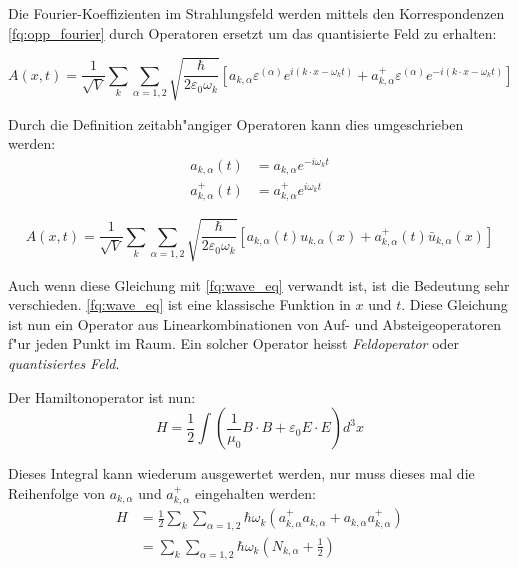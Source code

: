 Die Fourier-Koeffizienten im Strahlungsfeld werden mittels den Korrespondenzen \ref{fq:opp_fourier} durch Operatoren ersetzt um das quantisierte Feld zu erhalten:

\begin{equation*}
A(x,t) = \frac{1}{\sqrt{V}} \sum_k \sum_{\alpha=1,2} \sqrt{\frac{\hbar}{2 \varepsilon_0 \omega_k}} \left[a_{k,\alpha} \varepsilon^{(\alpha)} e^{i (k \cdot x - \omega_k t)} + a^+_{k,\alpha} \varepsilon^{(\alpha)} e^{-i (k \cdot x - \omega_k t)}\right]
\end{equation*}

Durch die Definition zeitabh"angiger Operatoren kann dies umgeschrieben werden:
\begin{align*}
a_{k,\alpha}(t) &= a_{k,\alpha} e^{-i \omega_k t} \\
a^+_{k,\alpha}(t) &= a^+_{k,\alpha} e^{i \omega_k t}
\end{align*}

\begin{equation*}
A(x,t) = \frac{1}{\sqrt{V}} \sum_k \sum_{\alpha=1,2} \sqrt{\frac{\hbar}{2 \varepsilon_0 \omega_k}}\left[a_{k,\alpha}(t) u_{k,\alpha}(x) + a^+_{k,\alpha}(t) \bar{u}_{k,\alpha}(x) \right]
\end{equation*}

Auch wenn diese Gleichung mit \ref{fq:wave_eq} verwandt ist, ist die Bedeutung sehr verschieden. \ref{fq:wave_eq} ist eine klassische Funktion in $x$ und $t$. Diese Gleichung ist nun ein Operator aus Linearkombinationen von Auf- und Absteigeoperatoren f"ur jeden Punkt im Raum. Ein solcher Operator heisst {\em Feldoperator} oder {\em quantisiertes Feld}.

Der Hamiltonoperator ist nun:
\begin{equation*}
H = \frac{1}{2} \int \left(\frac{1}{\mu_0} B \cdot B + \varepsilon_0 E \cdot E \right) d^3 x
\end{equation*}

Dieses Integral kann wiederum ausgewertet werden, nur muss dieses mal die Reihenfolge von $a_{k,\alpha}$ und $a^+_{k,\alpha}$ eingehalten werden:
\begin{equation*}
\begin{split}
H &= \frac{1}{2} \sum_k \sum_{\alpha=1,2} \hbar \omega_k \left(a^+_{k,\alpha} a_{k,\alpha} + a_{k,\alpha} a^+_{k,\alpha}\right) \\
&= \sum_k \sum_{\alpha=1,2} \hbar \omega_k \left(N_{k,\alpha} + \frac{1}{2} \right)
\end{split}
\end{equation*}


